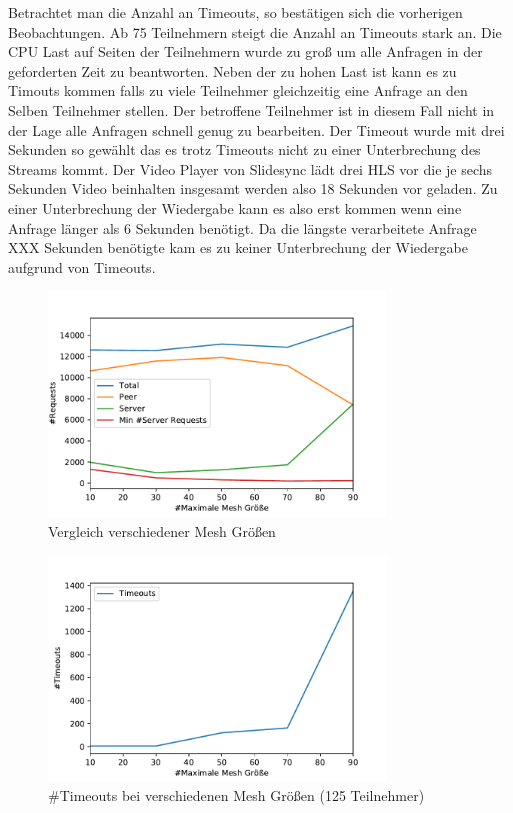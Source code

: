 Betrachtet man die Anzahl an Timeouts, so bestätigen sich die vorherigen Beobachtungen. Ab 75 Teilnehmern steigt die Anzahl an Timeouts stark an. Die CPU Last auf Seiten der Teilnehmern wurde zu groß um alle Anfragen in der geforderten Zeit zu beantworten. Neben der zu hohen Last ist kann es zu Timouts kommen falls zu viele Teilnehmer gleichzeitig eine Anfrage an den Selben Teilnehmer stellen. Der betroffene Teilnehmer ist in diesem Fall nicht in der Lage alle Anfragen schnell genug zu bearbeiten. Der Timeout wurde mit drei Sekunden so gewählt das es trotz Timeouts nicht zu einer Unterbrechung des Streams kommt. Der Video Player von Slidesync lädt drei HLS vor die je sechs Sekunden Video beinhalten insgesamt werden also 18 Sekunden vor geladen. Zu einer Unterbrechung der Wiedergabe kann es also erst kommen wenn eine Anfrage länger als 6 Sekunden benötigt. Da die längste verarbeitete Anfrage XXX Sekunden benötigte kam es zu keiner Unterbrechung der Wiedergabe aufgrund von Timeouts.

\begin{figure}[!h]
	\centering
	\includegraphics[width=0.8\textwidth]{figures/mesh_comparison}
	\caption[A Figure Short-Title]{Vergleich verschiedener Mesh Größen}
	\label{fig:mesh_comparison}
\end{figure}

\begin{figure}[!h]
	\centering
	\includegraphics[width=0.8\textwidth]{figures/timeouts_meshed}
	\caption[A Figure Short-Title]{#Timeouts bei verschiedenen Mesh Größen (125 Teilnehmer)}
	\label{fig:timeouts_meshed}
\end{figure}

